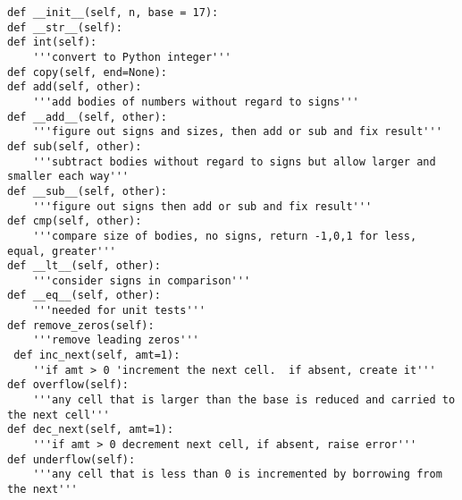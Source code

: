 \documentclass{article}
\begin{document}
\begin{description}
\begin{lstlisting}
def __init__(self, n, base = 17):
def __str__(self):
def int(self):
    '''convert to Python integer'''
def copy(self, end=None):
def add(self, other):
    '''add bodies of numbers without regard to signs'''
def __add__(self, other):
    '''figure out signs and sizes, then add or sub and fix result'''
def sub(self, other):
    '''subtract bodies without regard to signs but allow larger and smaller each way'''
def __sub__(self, other):
    '''figure out signs then add or sub and fix result'''
def cmp(self, other):
    '''compare size of bodies, no signs, return -1,0,1 for less, equal, greater'''        
def __lt__(self, other):
    '''consider signs in comparison'''
def __eq__(self, other):
    '''needed for unit tests'''
def remove_zeros(self):
    '''remove leading zeros'''               
 def inc_next(self, amt=1):
    ''if amt > 0 'increment the next cell.  if absent, create it'''
def overflow(self):
    '''any cell that is larger than the base is reduced and carried to the next cell''' 
def dec_next(self, amt=1):
    '''if amt > 0 decrement next cell, if absent, raise error'''            
def underflow(self):
    '''any cell that is less than 0 is incremented by borrowing from the next'''
\end{lstlisting}
\end{description}
\end{document}
